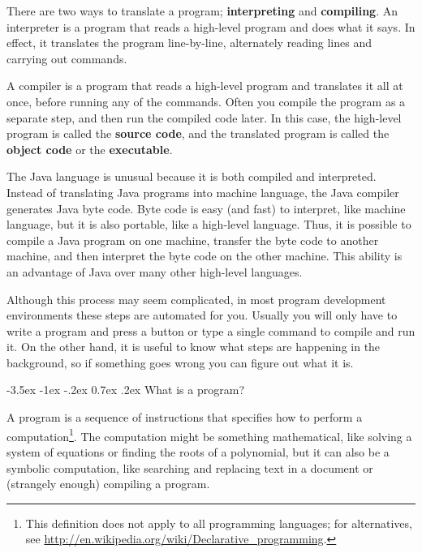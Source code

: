 \documentclass{book}
\makeatletter
\renewcommand{\section}{\@startsection 
    {section} {1} {0mm}%
    {-3.5ex \@plus -1ex \@minus -.2ex}%
    {0.7ex \@plus.2ex}%
    {\normalfont\Large\bfseries}}
\makeatother
\begin{document}
There are two ways to translate a program;
{\bf interpreting} and {\bf compiling}.  An interpreter
is a program that reads a high-level program
and does what it says.  In effect, it translates
the program line-by-line, alternately reading lines and
carrying out commands.

A compiler is a program that reads a high-level program and
translates it all at once, before running any of the commands.
Often you compile the program as a separate step, and then
run the compiled code later.  In this case, the high-level
program is called the {\bf source code}, and the translated
program is called the {\bf object code} or the {\bf executable}.

The Java language is unusual because it is both compiled and
interpreted.  Instead of translating Java programs into
machine language, the Java compiler generates Java byte code.
Byte code is easy (and fast) to interpret, like machine language,
but it is also portable, like a high-level language.  Thus,
it is possible to compile a Java program on one machine,
transfer the byte code to another machine,
and then interpret the byte code on the other machine.  This
ability is an advantage of Java over many other
high-level languages.




Although this process may seem complicated, in most program
development environments these steps
are automated for you.  Usually you will only have to write a program
and press a button or type a single command to compile and run it.  On
the other hand, it is useful to know what steps are
happening in the background, so if something goes wrong you can
figure out what it is.



\section{What is a program?}

A program is a sequence of instructions that specifies how to perform
a computation\footnote{This definition does not apply to all
  programming languages; for alternatives, see
  \url{http://en.wikipedia.org/wiki/Declarative_programming}.}.  The
computation might be something mathematical, like solving a system of
equations or finding the roots of a polynomial, but it can also be a
symbolic computation, like searching and replacing text in a document
or (strangely enough) compiling a program.
\end{document}
